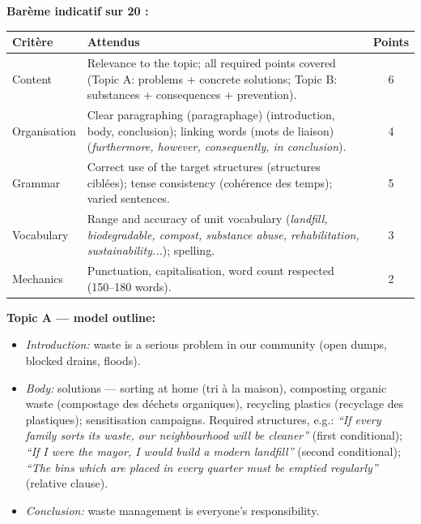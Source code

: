\documentclass[11pt]{article}
\newcommand{\cle}[1]{{\popxbold\color{popdark}#1}}
\begin{document}
\begin{corrige}
\textbf{Barème indicatif sur 20 :}
\begin{center}
\begin{tabularx}{\linewidth}{|l|X|c|}\hline
\rowcolor{popblueL} \textbf{Critère} & \textbf{Attendus} & \textbf{Points} \\ \hline
Content & Relevance to the topic; all required points covered (Topic A: problems + concrete solutions; Topic B: substances + consequences + prevention). & 6 \\ \hline
Organisation & Clear \cle{paragraphing (paragraphage)} (introduction, body, conclusion); \cle{linking words (mots de liaison)} (\emph{furthermore, however, consequently, in conclusion}). & 4 \\ \hline
Grammar & Correct use of the \cle{target structures (structures ciblées)}; \cle{tense consistency (cohérence des temps)}; varied sentences. & 5 \\ \hline
Vocabulary & Range and accuracy of unit vocabulary (\emph{landfill, biodegradable, compost, substance abuse, rehabilitation, sustainability...}); spelling. & 3 \\ \hline
Mechanics & Punctuation, capitalisation, word count respected (150--180 words). & 2 \\ \hline
\end{tabularx}
\end{center}

\textbf{Topic A --- model outline:}
\begin{itemize}
\item \emph{Introduction:} waste is a serious problem in our community (open dumps, blocked drains, floods).
\item \emph{Body:} solutions --- \cle{sorting at home (tri à la maison)}, \cle{composting organic waste (compostage des déchets organiques)}, \cle{recycling plastics (recyclage des plastiques)}; sensitisation campaigns. Required structures, e.g.: \emph{``If every family sorts its waste, our neighbourhood will be cleaner''} (\cle{first conditional}); \emph{``If I were the mayor, I would build a modern landfill''} (\cle{second conditional}); \emph{``The bins which are placed in every quarter must be emptied regularly''} (\cle{relative clause}).
\item \emph{Conclusion:} waste management is everyone's responsibility.
\end{itemize}


\end{corrige}
\end{document}
